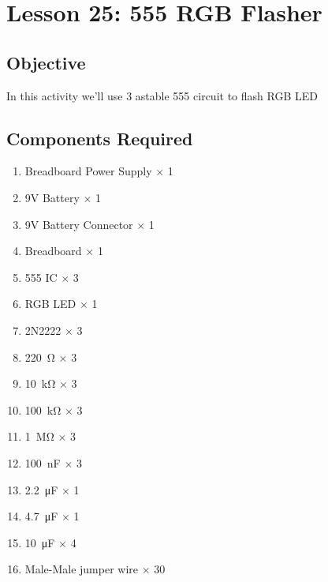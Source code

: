 \section{Lesson 25: 555 RGB Flasher}
\subsection{Objective}
In this activity we'll use 3 astable 555 circuit to flash RGB LED
\subsection{Components Required}
\begin{enumerate}
    \item Breadboard Power Supply $\times$ 1
    \item 9V Battery $\times$ 1
    \item 9V Battery Connector $\times$ 1
    \item Breadboard $\times$ 1
    \item 555 IC $\times$ 3
    \item RGB LED $\times$ 1
    \item 2N2222 $\times$ 3
    \item \SI{220}{\ohm} $\times$ 3
    \item \SI{10}{\kilo\ohm} $\times$ 3
    \item \SI{100}{\kilo\ohm} $\times$ 3
    \item \SI{1}{\Mohm} $\times$ 3
    \item \SI{100}{\nano\farad} $\times$ 3
    \item \SI{2.2}{\micro\farad} $\times$ 1
    \item \SI{4.7}{\micro\farad} $\times$ 1
    \item \SI{10}{\micro\farad} $\times$ 4
    \item Male-Male jumper wire $\times$ 30
\end{enumerate}
